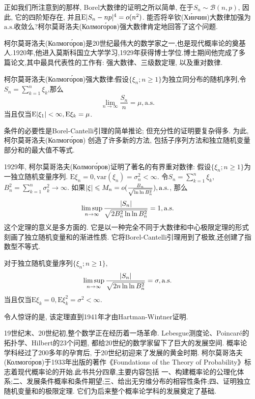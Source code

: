 正如我们所注意到的那样, Borel大数律的证明之所以简单, 在于$S_n\sim\mathcal{B}(n,p)$, 因此, 它的四阶矩存在, 并且$\mathrm{E}\lvert S_n-np\rvert^4 = o(n^2)$. 能否将辛钦(Хи́нчин)大数律加强为$\mathrm{a.s.}$收敛么?柯尔莫哥洛夫(Колмого́ров)强大数律肯定地回答了这个问题.

柯尔莫哥洛夫(Колмого́ров)是20世纪最伟大的数学家之一,也是现代概率论的奠基人.1920年,他进入莫斯科国立大学学习,1929年获得博士学位.博士期间他完成了多篇论文,其中最具代表性的工作有: 强大数律、三级数定理, 以及重对数律.

柯尔莫哥洛夫(Колмого́ров)强大数律:假设$\{\xi_n;n\geqslant 1\}$为独立同分布的随机序列,令$S_n =\sum_{k=1}^n\xi_k$,那么\begin{equation}\label{eq:A32}
\lim_{n\to\infty}\frac{S_n}{n} = \mu,\mathrm{a.s.}
\end{equation}
当且仅当$\mathrm{E}\lvert\xi_1\rvert<\infty,\mathrm{E}\xi_k = \mu$.

条件的必要性是Borel-Cantelli引理的简单推论; 但充分性的证明要复杂得多. 为此, 柯尔莫哥洛夫(Колмого́ров)
创造了许多新的方法, 包括子序列方法和独立随机变量部分和的最大值不等式.

1929年, 柯尔莫哥洛夫(Колмого́ров)证明了著名的有界重对数律:
假设$\{\xi_n;n\geqslant 1\}$为一独立随机变量序列. $\mathrm{E}\xi_n = 0,\mathrm{var}(\xi_n) = \sigma^2_n<\infty$. 令$S_n = \sum_{k=1}^n\xi_k$, $B_n^2 = \sum_{k=1}^n\sigma_k^2\to\infty$. 如果$\lvert\xi\rvert\leqslant M_n = o(\frac{B_n}{\sqrt{\ln\ln B_n^2}}),\mathrm{a.s.}$, 那么\begin{equation}\label{eq:A33}
\limsup_{n\to\infty}\frac{\lvert S_n\rvert}{\sqrt{2B_n^2\ln\ln B_n^2}} = 1,\mathrm{a.s.}
\end{equation}
这个定理的意义是多方面的. 它是以一种完全不同于大数律和中心极限定理的形式刻画了独立随机变量和的渐进性质. 它将Borel-Cantelli引理用到了极致,还创建了指数型不等式.

对于独立随机变量序列$\{\xi_n;n\geqslant 1\}$,\begin{equation}\label{eq:A34}
\limsup_{n\to\infty}\frac{\lvert S_n\rvert}{\sqrt{2n\ln\ln B_n^2}} = \sigma,\mathrm{a.s.}
\end{equation}
当且仅当$\mathrm{E}\xi_k = 0,\mathrm{E}\xi_k^2 = \sigma^2<\infty$.

令人惊讶的是, 该定理直到1941年才由Hartman-Wintner证明.

19世纪末、20世纪初,整个数学正在经历着一场革命. Lebesgue测度论、Poincaré的拓扑学、Hilbert的23个问题, 都给20世纪的数学家留下了巨大的发展空间. 概率论学科经过了200多年的孕育后, 于20世纪初迎来了发展的黄金时期. 柯尔莫哥洛夫(Колмого́ров)于1933年出版的著作《Foundations of the Theory of Probability》标志着现代概率论的开始.此书共分四章,主要内容包括
一、构建概率论的公理化体系;二、发展条件概率和条件期望;三、给出无穷维分布的相容性条件;四、证明独立随机变量和的极限定理. 它们为后来整个概率论学科的发展奠定了基础.

